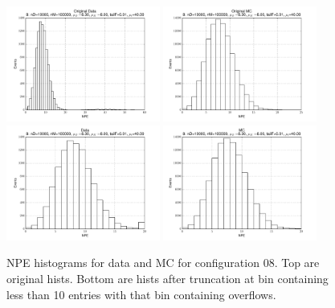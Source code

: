  \begin{figure}[htbp] \begin{center} 
\includegraphics[width=0.45\textwidth]{../FIGURES/08/FIG_Original_Data.pdf} 
\includegraphics[width=0.45\textwidth]{../FIGURES/08/FIG_Original_MC.pdf} 
\includegraphics[width=0.45\textwidth]{../FIGURES/08/FIG_Data.pdf} 
\includegraphics[width=0.45\textwidth]{../FIGURES/08/FIG_MC.pdf} 
\caption{NPE histograms for data and MC for configuration 08. Top are original hists. Bottom are hists after truncation at bin containing less than 10 entries with that bin containing overflows.} 
\label{tab:npe_08} 
\end{center} \end{figure} 

 